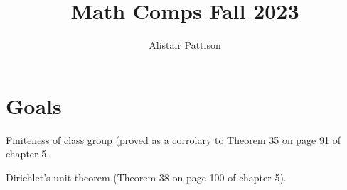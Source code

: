\documentclass{ali-notes}
\title{Math Comps Fall 2023}
\author{Alistair Pattison}
\begin{document}
\maketitle

\section{Goals}

Finiteness of class group (proved as a corrolary to Theorem 35 on page 91 of chapter 5.

Dirichlet's unit theorem (Theorem 38 on page 100 of chapter 5).









\end{document}
